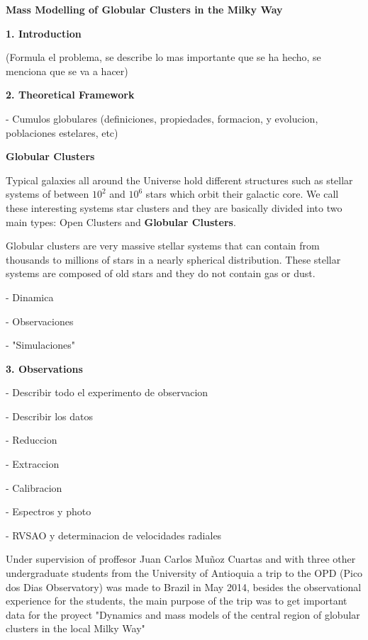 \documentclass[english]{article}
\begin{document}
\parskip=3mm
\parindent=0mm


\begin{center}
\textbf{{\huge Mass Modelling of Globular Clusters in the Milky Way}}
\end{center}

\textbf{{\LARGE 1. Introduction}}

(Formula el problema, se describe lo mas importante que se ha hecho, se menciona que se va a hacer)

\textbf{{\LARGE 2. Theoretical Framework}}

- Cumulos globulares (definiciones, propiedades, formacion, y evolucion, poblaciones estelares, etc)

\textbf{{\Large Globular Clusters}}

Typical galaxies all around the Universe hold different structures such as stellar systems of between $ 10^{2} $ and $ 10^{6} $ stars which orbit their galactic core. We call these interesting systems star clusters and they are basically divided into two main types: Open Clusters and \textbf{Globular Clusters}.

Globular clusters are very massive stellar systems that can contain from thousands to millions of stars in a nearly spherical distribution. These stellar systems are composed of old stars and they do not contain gas or dust. 

- Dinamica

- Observaciones

- "Simulaciones"

\textbf{{\LARGE 3. Observations}}

- Describir todo el experimento de observacion

- Describir los datos

- Reduccion

- Extraccion

- Calibracion

- Espectros y photo

- RVSAO y determinacion de velocidades radiales

Under supervision of proffesor Juan Carlos Mu\~noz Cuartas and with three other undergraduate students from the University of Antioquia a trip to the OPD (Pico dos Dias Observatory) was made to Brazil in May 2014, besides the observational experience for the students, the main purpose of the trip was to get important data for the proyect "Dynamics and mass models of the central region of globular clusters in the local Milky Way"
\end{document}
